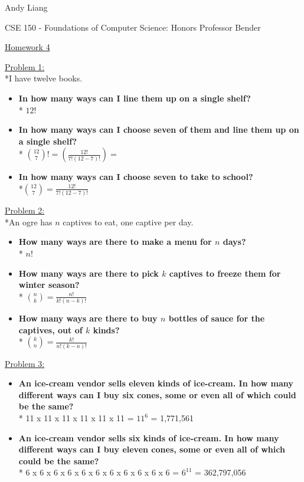 \documentclass[12pt]{article}
\begin{document}
\begin{flushleft}
Andy Liang

CSE 150 - Foundations of Computer Science: Honors
Professor Bender
\end{flushleft}
\medskip
\centerline{\uline{Homework 4}}
\bigskip\bigskip

\noindent
\uline{Problem 1:}
\\*I have twelve books.
\begin{itemize}
\item\textbf{In how many ways can I line them up on a single shelf?}
\\* $12!$
\item\textbf{In how many ways can I choose seven of them and line them up on a single shelf?}
\\* ${{12}\choose{7}}!= (\frac{12!}{7!(12-7)!}) = $
\item\textbf{In how many ways can I choose seven to take to school?}
\\*${{12}\choose{7}} = \frac{12!}{7!(12-7)!}$
\end{itemize}
\bigskip

\noindent
\uline{Problem 2:}
\\*An ogre has $n$ captives to eat, one captive per day.
\begin{itemize}
\item\textbf{How many ways are there to make a menu for $n$ days?}
\\* $n!$
\item\textbf{How many ways are there to pick $k$ captives to freeze them for winter season?}
\\* ${{n}\choose{k}} = \frac{n!}{k!(n-k)!}$
\item\textbf{How many ways are there to buy $n$ bottles of sauce for the captives, out of $k$ kinds?}
\\* ${{k}\choose{n}} = \frac{k!}{n!(k-n)!}$
\end{itemize}
\bigskip

\noindent
\uline{Problem 3:}
\begin{itemize}
\item\textbf{An ice-cream vendor sells eleven kinds of ice-cream. In how many different ways can I buy six cones, some or even all of which could be the same?}
\\* 11 x 11 x 11 x 11 x 11 x 11 = $11^6$ = 1,771,561
\item\textbf{An ice-cream vendor sells six kinds of ice-cream. In how many different ways can I buy eleven cones, some or even all of which could be the same?}
\\* 6 x 6 x 6 x 6 x 6 x 6 x 6 x 6 x 6 x 6 x 6 = $6^{11}$ = 362,797,056
\end{itemize}
\bigskip
\end{document}
